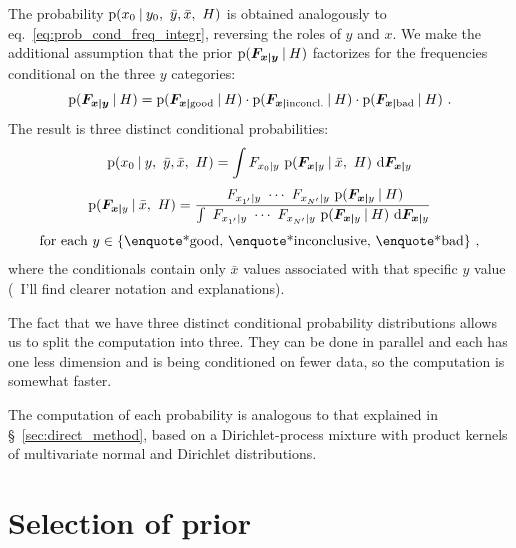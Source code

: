\documentclass[\ifafour a4paper,12pt,\else a5paper,10pt,\fi%
onecolumn,oneside,article,%
british%
]{memoir}
\theoremstyle{remark}
\theoremstyle{innote}
\newcommand*{\di}{\mathrm{d}}%
\DeclarePairedDelimiter\set{\{}{\}}
\newcommand*{\p}{\mathrm{p}}%
\renewcommand*{\|}[1][]{\nonscript\:#1\vert\nonscript\:\mathopen{}}
\renewcommand*{\=}{\TextOrMath\texteq\eq}
\newcommand*{\sect}{\S}%
\newcommand*{\eqn}{eq.}%
\newcommand*{\wrench}{{\fontencoding{U}\fontfamily{fontawesomethree}\selectfont\symbol{114}}}
\newcommand{\mynote}[1]{ {\color{notecolour}#1}}
\newcommand*{\wy}{\bar{y}}
\newcommand*{\wx}{\bar{x}}
\newcommand*{\yF}{\bm{F}}
\newcommand*{\yFxy}{\yF_{\bm{x\mid y}}}
\begin{document}
The probability $\p(x_{0} \| y_{0},\ \wy,\wx,\ H)$ is obtained analogously
to \eqn~\eqref{eq:prob_cond_freq_integr}, reversing the roles of $y$ and
$x$. We make the additional assumption that the prior
$\p(\yFxy \| H)$ factorizes for the frequencies conditional on the three
$y$ categories:
\begin{equation}
  \label{eq:factor_prior_cond}
  \p(\yFxy \| H) =
  \p(\yF_{\bm{x \mid} \text{good}} \| H)\cdot
  \p(\yF_{\bm{x \mid} \text{inconcl.}} \| H)\cdot 
  \p(\yF_{\bm{x \mid} \text{bad}} \| H)\ .
\end{equation}
The result is three distinct conditional probabilities:
\begin{equation}
  \label{eq:reverse_case_main}
  \begin{gathered}
  \p(x_{0} \| y,\ \wy,\wx,\ H) =
\int F_{x_{0}\|y} \ \p(\yF_{\bm{x\mid}y} \| \wx,\ H)\ \di\yF_{\bm{x\mid}y}
  \\[\jot]
  \p(\yF_{\bm{x\mid}y} \| \wx,\ H) =
  \frac{
    \ F_{x_{1'}\| y} \  \dotsm \ 
  F_{x_{N'}\| y} \ \p(\yF_{\bm{x\mid}y}  \| H)
  }{
    \int
    \ F_{x_{1'}\| y} \  \dotsm \ 
  F_{x_{N'}\| y} \ \p(\yF_{\bm{x\mid}y}  \| H)\ \di\yF_{\bm{x\mid}y} 
}\\[\jot]
  \text{for each } y \in
  \set{\text{\enquote*{good}},\, \text{\enquote*{inconclusive}},\,
    \text{\enquote*{bad}}}\ ,
\end{gathered}
\end{equation}
where the conditionals contain only $\wx$ values associated with that
specific $y$ value \mynote{(\wrench\ I'll find clearer notation and
  explanations)}.

The fact that we have three distinct conditional probability distributions
allows us to split the computation into three. They can be done in parallel
and each has one less dimension and is being conditioned on fewer data, so
the computation is somewhat faster.

The computation of each probability is analogous to that explained in
\sect~\ref{sec:direct_method}, based on a Dirichlet-process mixture with
product kernels of multivariate normal and Dirichlet distributions. 




\section{Selection of prior}
\label{sec:sel_prior_reverse}
\end{document}
